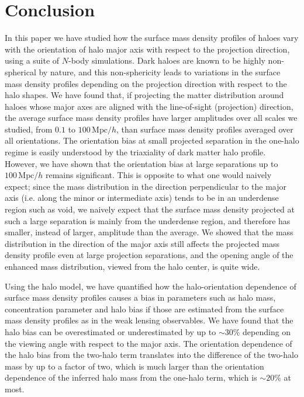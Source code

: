 \documentclass[a4paper,fleqn,usenatbib]{mnras}
\newcommand{\Mpc}{\mathrm{Mpc}}
\begin{document}
\section{Conclusion}
\label{sec:conclusion}
In this paper we have studied how the surface mass density profiles
of haloes vary with the orientation of halo major axis
with respect to the projection direction, using a suite of $N$-body simulations.
Dark haloes are known to be highly non-spherical by nature, and this non-sphericity
leads to variations in the surface mass density profiles
depending on the projection direction with respect to the halo shapes.
We have found that, if projecting the matter distribution around haloes
whose major axes are aligned with the line-of-sight (projection) direction,
the average surface mass density profiles have larger
amplitudes over all scales we studied,
from $0.1$ to $100\,\Mpc/h$, than surface mass density profiles
averaged over all orientations.
The orientation bias at small projected separation
in the one-halo regime is easily understood by the triaxiality
of dark matter halo profile. However, we have shown that the orientation bias
at large separations up to $100\,\Mpc/h$ remains significant.
This is opposite to what one would naively expect;
since the mass distribution in the direction perpendicular
to the major axis (i.e. along the minor or intermediate axis) tends to be
in an underdense region such as void,
we naively expect that the surface mass density projected at
such a large separation is mainly from the underdense region,
and therefore has smaller, instead of larger, amplitude than the average.
We showed that the mass distribution
in the direction of the major axis still affects the projected mass
density profile even at large projection separations,
and the opening angle of the enhanced mass distribution,
viewed from the halo center, is quite wide.

Using the halo model, we have quantified how the halo-orientation dependence of
surface mass density profiles causes a bias in parameters such as halo mass,
concentration parameter and halo bias if those are estimated
from the surface mass density profiles as in the weak lensing observables.
We have found that the halo bias can be overestimated or
underestimated by up to $\sim 30\%$ depending on the viewing angle
with respect to the major axis. The orientation dependence of
the halo bias from the two-halo term translates into the difference of
the two-halo mass by up to a factor of two, which is much larger than
the orientation dependence of the inferred halo mass from the one-halo
term, which is $\sim 20\%$ at most.
\end{document}
